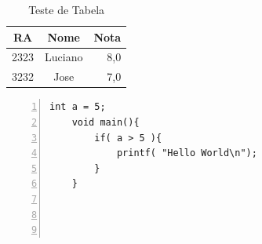 \begin{table}[htb]
	\centering
	\caption{Teste de Tabela}
	\begin{tabular}{ccr}
		\hline
		\textbf{RA} & \textbf{Nome} & 
		\textbf{Nota} \\
		\hline
		2323 & Luciano & 8,0 \\
		3232 & Jose & 7,0 \\
		\hline
	\end{tabular}
	\label{tab:tabela}
\end{table}
\lstset{language=C}
\begin{lstlisting}[frame=single, numbers=left]
	int a = 5;
	void main(){
		if( a > 5 ){
			printf( "Hello World\n");
		}
	}
	
	
	
\end{lstlisting}


\lipsum[3-8]
%
